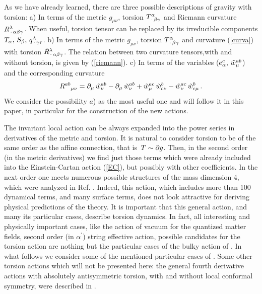 As we have already learned, there are three possible
descriptions of gravity with torsion: 
\vskip 1mm
a) In terms of the metric $g_{\mu\nu}$, torsion 
$T^\alpha_{\,\cdot\,\beta\gamma}$ and Riemann curvature 
$R^\lambda_{\,\cdot\,\alpha\beta\gamma}$. When useful, torsion 
tensor can be replaced by its irreducible components
$T_\alpha,\,S_\beta,\,q^\lambda_{\,\cdot\,\gamma\tau}$.
\vskip 1mm
b) In terms of the metric $g_{\mu\nu}$, torsion 
$T^\alpha_{\,\cdot\,\beta\gamma}$ and curvature (\ref{curva}) 
with torsion
${\tilde R}^\lambda_{\,\cdot\,\alpha\beta\gamma}$. The relation 
between two curvature tensors,with and without torsion, 
is given by (\ref{riemann}).
\vskip 1mm
c) In terms of the variables ($e_\alpha^c,\,{\tilde w}^{ab}_\mu$) 
and the corresponding curvature 
$$
R^{ab}_{\,\,\,\,\,\,\mu\nu} = \partial_\mu\,{\tilde w}^{ab}_\nu
-  \partial_\mu\,{\tilde w}^{ab}_\nu 
+ {\tilde w}^{ac}_\mu \, {\tilde w}^b_{c\nu}
 -{\tilde w}^{ac}_\nu \, {\tilde w}^b_{c\mu}\,.  
$$
\vskip 1mm
We consider the possibility $a$) as the most useful one and 
will follow it in this paper, in particular for the 
construction of the new actions. 

The invariant local action can be always
expanded into the power series in derivatives of the 
metric and torsion. It is natural to consider torsion 
to be of the same order as the affine connection, that 
is $\,T\sim \partial g$. Then, in the second order (in the 
metric derivatives) we find just those terms which were
already included into the Einstein-Cartan action (\ref{EC}),
but possibly with other coefficients. In the next
order one meets numerous possible structures of the 
mass dimension 4, which were 
analyzed in Ref. \cite{chris}. Indeed, this action,
which includes more than 100 dynamical terms, and many
surface terms, does not look attractive for 
deriving physical predictions of the theory. 
It is important that this general action, and many its 
particular cases, describe torsion dynamics. In fact, all 
interesting and physically important cases, like the 
action of vacuum for the quantized matter fields, 
second order (in $\alpha^\prime$) string effective action, 
possible candidates for the torsion action \cite{betor}
are nothing but the particular cases of the bulky action
of \cite{chris}. In what follows we consider some of the 
mentioned particular cases of \cite{chris}. 
Some other torsion actions
which will not be presented here: the general fourth derivative 
actions 
with absolutely antisymmetric torsion, with and without 
local conformal symmetry, were described in \cite{book}. 


